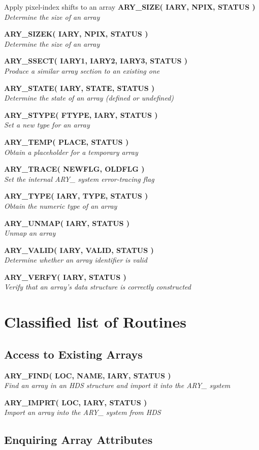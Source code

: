 \documentclass[twoside,11pt,nolof]{starlink}
\providecommand{\noteroutine}[2]{\textbf{#1}\hspace*{\fill}\nopagebreak \\
                             \hspace*{3em}\emph{#2}\hspace*{\fill}\par}
\begin{document}
            {Apply pixel-index shifts to an array}
\noteroutine{ARY\_SIZE( IARY, NPIX, STATUS )}
            {Determine the size of an array}
\noteroutine{ARY\_SIZEK( IARY, NPIX, STATUS )}
            {Determine the size of an array}
\noteroutine{ARY\_SSECT( IARY1, IARY2, IARY3, STATUS )}
            {Produce a similar array section to an existing one}
\noteroutine{ARY\_STATE( IARY, STATE, STATUS )}
            {Determine the state of an array (defined or undefined)}
\noteroutine{ARY\_STYPE( FTYPE, IARY, STATUS )}
            {Set a new type for an array}
\noteroutine{ARY\_TEMP( PLACE, STATUS )}
            {Obtain a placeholder for a temporary array}
\noteroutine{ARY\_TRACE( NEWFLG, OLDFLG )}
            {Set the internal ARY\_ system error-tracing flag}
\noteroutine{ARY\_TYPE( IARY, TYPE, STATUS )}
            {Obtain the numeric type of an array}
\noteroutine{ARY\_UNMAP( IARY, STATUS )}
            {Unmap an array}
\noteroutine{ARY\_VALID( IARY, VALID, STATUS )}
            {Determine whether an array identifier is valid}
\noteroutine{ARY\_VERFY( IARY, STATUS )}
            {Verify that an array's data structure is correctly constructed}


\newpage
\section{Classified list of Routines}
\label{classified_list_of_routines}


\subsection{Access to Existing Arrays}
\label{access_to_existing_arrays}

\noteroutine{ARY\_FIND( LOC, NAME, IARY, STATUS )}
            {Find an array in an HDS structure and import it into the ARY\_ system}
\noteroutine{ARY\_IMPRT( LOC, IARY, STATUS )}
            {Import an array into the ARY\_ system from HDS}


\subsection{Enquiring Array Attributes}
\label{enquiring_array_attributes}
\end{document}
